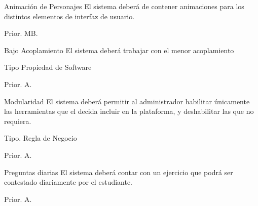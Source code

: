 \begin{RF}{Animación de Personajes}{%
    El sistema deberá de contener animaciones para los distintos elementos de interfaz de usuario. }
    \item[] Prior. MB. %
\end{RF}

\begin{RNF}{Bajo Acoplamiento}{%
    El sistema deberá trabajar con el menor acoplamiento}
    \item[Tipo] Propiedad de Software
    \item[] Prior. A. %
\end{RNF}

\begin{comment}
\begin{RNF}{Robustez}{%
    El sistema debe, INSERTAR AQUI MÉTRICA DE ROBUSTEZ. }
    \item[Tipo] Propiedad de Software
    \item[] Prior. MA. %
\end{RNF}
\end{comment}

\begin{RNF}{Modularidad}{%
    El sistema deberá permitir al administrador habilitar únicamente las herramientas que el decida incluir en la plataforma, y deshabilitar las que no requiera.}
    \item[Tipo.] Regla de Negocio
    \item[] Prior. A. %
\end{RNF}

\begin{RF}{Preguntas diarias}{%
    El sistema deberá contar con un ejercicio que podrá ser contestado diariamente por el estudiante.}
    \item[] Prior. A. %
\end{RF}